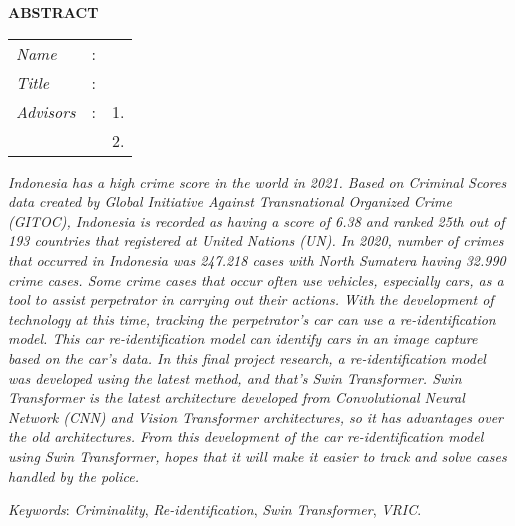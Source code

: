 \begin{center}
  \large\textbf{ABSTRACT}
\end{center}


\vspace{2ex}

\begingroup
\setlength{\tabcolsep}{0pt}

\noindent
\begin{tabularx}{\textwidth}{l >{\centering}m{3em} X}
  \emph{Name}     & : & \name{}         \\

  \emph{Title}    & : & \engtatitle{}   \\

  \emph{Advisors} & : & 1. \advisor{}   \\
                  &   & 2. \coadvisor{} \\
\end{tabularx}
\endgroup

\emph{Indonesia has a high crime score in the world in 2021. Based on Criminal Scores data
created by Global Initiative Against Transnational Organized Crime (GITOC), Indonesia is
recorded as having a score of 6.38 and ranked 25th out of 193 countries that registered at United
Nations (UN). In 2020, number of crimes that occurred in Indonesia was 247.218 cases with
North Sumatera having 32.990 crime cases. Some crime cases that occur often use vehicles,
especially cars, as a tool to assist perpetrator in carrying out their actions. With the development 
of technology at this time, tracking the perpetrator's car can use a re-identification model.
This car re-identification model can identify cars in an image capture based on the car's data.
In this final project research, a re-identification model was developed using the latest method,
and that's Swin Transformer. Swin Transformer is the latest architecture developed from Convolutional 
Neural Network (CNN) and Vision Transformer architectures, so it has advantages
over the old architectures. From this development of the car re-identification model using Swin
Transformer, hopes that it will make it easier to track and solve cases handled by the police.}

\emph{Keywords}: \emph{Criminality}, \emph{Re-identification}, \emph{Swin Transformer}, \emph{VRIC}.
